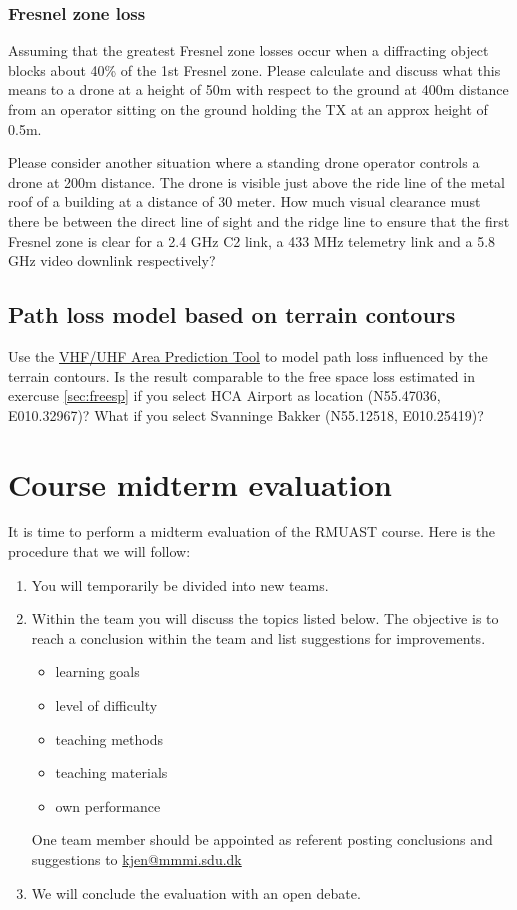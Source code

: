 \documentclass[a4paper,10pt,fleqn]{article}
\begin{document}
\subsubsection{Fresnel zone loss}
Assuming that the greatest Fresnel zone losses occur when a diffracting object blocks about 40\% of the 1st Fresnel zone. Please calculate and discuss what this means to a drone at a height of 50m with respect to the ground at 400m distance from an operator sitting on the ground holding the TX at an approx height of 0.5m.

Please consider another situation where a standing drone operator controls a drone at 200m distance. The drone is visible just above the ride line of the metal roof of a building at a distance of 30 meter. How much visual clearance must there be between the direct line of sight and the ridge line to ensure that the first Fresnel zone is clear for a 2.4 GHz C2 link, a 433 MHz telemetry link and a 5.8 GHz video downlink respectively?


\subsection{Path loss model based on terrain contours}

Use the \href{http://www.sws.bom.gov.au/Category/HF\%20Systems/Online\%20Tools/Prediction\%20Tools/VUHF/VUHF.php}{VHF/UHF Area Prediction Tool} to model path loss influenced by the terrain contours. Is the result comparable to the free space loss estimated in exercuse \ref{sec:freesp} if you select HCA Airport as location (N55.47036, E010.32967)? What if you select Svanninge Bakker (N55.12518, E010.25419)?


\section{Course midterm evaluation}

It is time to perform a midterm evaluation of the RMUAST course. Here is the procedure that we will follow:

\begin{enumerate}
	\item You will temporarily be divided into new teams.
	\item Within the team you will discuss the topics listed below. The objective is to reach a conclusion within the team and list suggestions for improvements. 
	\begin{itemize}
		\item learning goals
		\item level of difficulty
		\item teaching methods
		\item teaching materials
		\item own performance
	\end{itemize}
	One team member should be appointed as referent posting conclusions and suggestions to \href{mailto:kjen@mmmi.sdu.dk}{kjen@mmmi.sdu.dk}
	\item We will conclude the evaluation with an open debate.
\end{enumerate}
\end{document}
